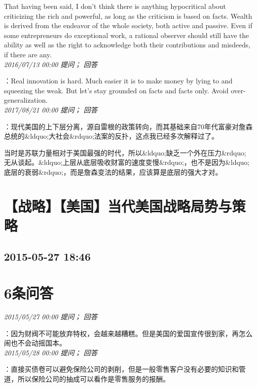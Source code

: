 \documentclass[twocolumn]{ctexart}
\begin{document}
That having been said, I don't think there is anything hypocritical about criticizing the rich and powerful, as long as the criticism is based on facts. Wealth is derived from the endeavor of the whole society, both active and passive. Even if some entrepreneurs do exceptional work, a rational observer should still have the ability as well as the right to acknowledge both their contributions and misdeeds, if there are any.\\

\textit{\hfill\noindent\small 2016/07/13 00:00 提问； 回答}

：Real innovation is hard. Much easier it is to make money by lying to and squeezing the weak. But let's stay grounded on facts and facts only. Avoid over-generalization.\\

\textit{\hfill\noindent\small 2017/08/21 00:00 提问； 回答}

：现代美国的上下层分离，源自雷根的政策转向，而其基础来自70年代富豪对詹森总统的\&ldquo;大社会\&rdquo;法案的反扑，这点我已经多次解释过了。

当时是苏联力量相对于美国最强的时代，所以\&ldquo;缺乏一个外在压力\&rdquo;无从谈起。\&ldquo;上层从底层吸收财富的速度变慢\&rdquo;，也不是因为\&ldquo;底层的衰弱\&rdquo;，而是詹森变法的结果，应该算是底层的强大才对。\\


\section{【战略】【美国】当代美国战略局势与策略}
\subsection{2015-05-27 18:46}


\section{6条问答}

\textit{\hfill\noindent\small 2015/05/27 00:00 提问； 回答}

：因为财阀不可能放弃特权，会越来越糟糕。但是美国的爱国宣传很到家，再怎么闹也不会动摇国本。\\

\textit{\hfill\noindent\small 2015/05/28 00:00 提问； 回答}

：直接买债卷可以避免保险公司的剥削，但是一般零售客户没有必要的知识和管道，所以保险公司的抽成可以看作是零售服务的报酬。
\end{document}
